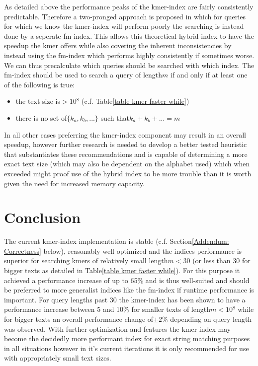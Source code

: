 As detailed above the performance peaks of the kmer-index are fairly
consistently predictable. Therefore a two-pronged approach is proposed in which
for queries for which we know the kmer-index will perform poorly the
searching is instead done by a seperate fm-index. This allows this theoretical hybrid index
to have the speedup the kmer offers while also covering the inherent inconsistencies by instead using the fm-index
which performs highly consistently if sometimes worse. We can thus
precalculate which queries should be searched with which index. The
fm-index should be used to search a query of length$m$ if and only
if at least one of the following is true:
\begin{itemize}
\item the text size is$>10{{}^8}$ (c.f. Table\ref{table kmer faster while})
\item there is no set of$\{k_{a},k_{b},...\}$ such that$k_{a}+k_{b}+...=m$
\end{itemize}
In all other cases preferring the kmer-index component may result
in an overall speedup, however further research is needed to develop
a better tested heuristic that substantiates these recommendations
and is capable of determining a more exact text size (which may also
be dependent on the alphabet used) which when exceeded might proof
use of the hybrid index to be more trouble than it is worth given
the need for increased memory capacity.

\chapter{Conclusion}

The current kmer-index implementation is stable (c.f. Section\ref{Addendum: Correctness}
below), reasonably well optimized and the indices performance is superior
for searching kmers of relatively small length$m<30$ (or less than
30 for bigger texts as detailed in Table\ref{table kmer faster while}).
For this purpose it achieved a performance increase of up to 65\%
and is thus well-suited and should be preferred to more generalist
indices like the fm-index if runtime performance is important. For
query lengths past 30 the kmer-index has been shown to have a performance
increase between 5 and 10\% for smaller texts of length$m<10{{}^8}$
while for bigger texts an overall performance change of$\pm2\%$ depending
on query length was observed. With further optimization and features
the kmer-index may become the decidedly more performant index for
exact string matching purposes in all situations however in it's current
iterations it is only recommended for use with appropriately small
text sizes.

